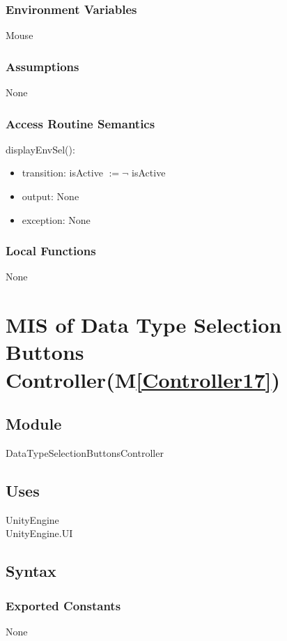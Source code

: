 \documentclass[12pt, titlepage]{article}
\newcommand{\mref}[1]{M\ref{#1}}
\begin{document}
\subsubsection{Environment Variables}
Mouse
\subsubsection{Assumptions}
None
\subsubsection{Access Routine Semantics}

\noindent displayEnvSel():
\begin{itemize}
\item transition: isActive $\mathit{:= \neg}$ isActive
\item output: None
\item exception: None
\end{itemize}
\subsubsection{Local Functions}
None


\newpage

\section{MIS of Data Type Selection Buttons Controller(\mref{Controller17})}  

\subsection{Module}
DataTypeSelectionButtonsController

\subsection{Uses}
UnityEngine\\
UnityEngine.UI\\

\subsection{Syntax}

\subsubsection{Exported Constants}
None
\end{document}
